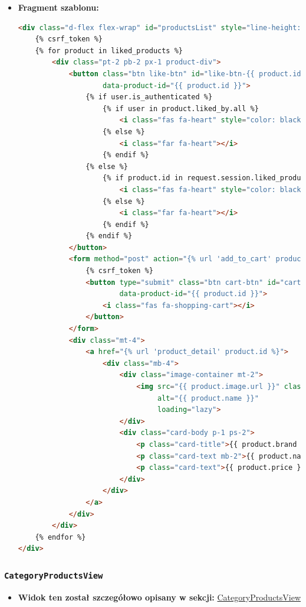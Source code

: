 \documentclass[12pt,a4paper,oneside]{article}
\theoremstyle{definition}
\numberwithin{equation}{section}
\begin{document}
\begin{itemize}
    \item \textbf{Fragment szablonu:}
        \begin{lstlisting}[language=HTML, caption=Fragment szablonu \texttt{favorites.html}]
<div class="d-flex flex-wrap" id="productsList" style="line-height: 1.3;">
    {% csrf_token %}
    {% for product in liked_products %}
        <div class="pt-2 pb-2 px-1 product-div">
            <button class="btn like-btn" id="like-btn-{{ product.id }}"
                    data-product-id="{{ product.id }}">
                {% if user.is_authenticated %}
                    {% if user in product.liked_by.all %}
                        <i class="fas fa-heart" style="color: black;"></i>
                    {% else %}
                        <i class="far fa-heart"></i>
                    {% endif %}
                {% else %}
                    {% if product.id in request.session.liked_products %}
                        <i class="fas fa-heart" style="color: black;"></i>
                    {% else %}
                        <i class="far fa-heart"></i>
                    {% endif %}
                {% endif %}
            </button>
            <form method="post" action="{% url 'add_to_cart' product.id %}" class="d-inline">
                {% csrf_token %}
                <button type="submit" class="btn cart-btn" id="cart-btn-{{ product.id }}"
                        data-product-id="{{ product.id }}">
                    <i class="fas fa-shopping-cart"></i>
                </button>
            </form>
            <div class="mt-4">
                <a href="{% url 'product_detail' product.id %}">
                    <div class="mb-4">
                        <div class="image-container mt-2">
                            <img src="{{ product.image.url }}" class="card-img-top"
                                 alt="{{ product.name }}"
                                 loading="lazy">
                        </div>
                        <div class="card-body p-1 ps-2">
                            <p class="card-title">{{ product.brand }}</p>
                            <p class="card-text mb-2">{{ product.name }}</p>
                            <p class="card-text">{{ product.price }} zl</p>
                        </div>
                    </div>
                </a>
            </div>
        </div>
    {% endfor %}
</div>
        \end{lstlisting}
\end{itemize}

\subsubsection*{\texttt{CategoryProductsView}}
\begin{itemize}
    \item \textbf{Widok ten został szczegółowo opisany w sekcji: }\hyperref[CategoryProductsView]{CategoryProductsView}
\end{itemize}
\end{document}
